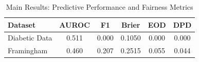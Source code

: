\begin{table}[H]
\centering
\caption{Main Results: Predictive Performance and Fairness Metrics}
\label{tab:main_results}
\begin{tabular}{lccccc}
\toprule
Dataset & AUROC & F1 & Brier & EOD & DPD \\
\midrule
Diabetic Data & 0.511 & 0.000 & 0.1050 & 0.000 & 0.000 \\
Framingham & 0.460 & 0.207 & 0.2515 & 0.055 & 0.044 \\
\bottomrule
\end{tabular}
\end{table}
